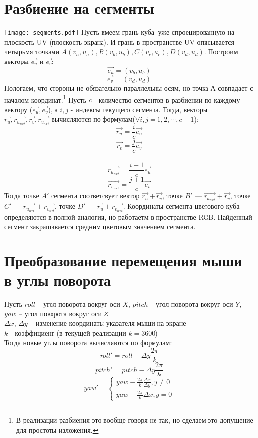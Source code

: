 \documentclass[a4paper,11pt]{article}
\begin{document}
  \section{Разбиение на сегменты}
 
  \texttt{[image: segments.pdf]}
  \linebreak 
   Пусть имеем грань куба, уже спроецированную на плоскость UV (плоскость экрана). И грань в пространстве UV описывается четырьмя точками $A(v_a,u_a), B(v_b,u_b), C(v_c,u_c), D(v_d,u_d)$. Построим векторы $\vec{e_u}$ и $\vec{e_v}$:
   \[ \vec{e_u} =  (v_b,u_b)\]
   \[ \vec{e_v} = (v_d,u_d)\]
   Пологаем, что стороны не обязательно параллельны осям, но точка $А$ совпадает с началом координат.\footnote{В реализации разбиения это вообще говоря не так, но сделаем это допущение для простоты изложения.} Пусть $c$ - количество сегментов в разбиении по каждому вектору ($\vec{e_u}, \vec{e_v}$), а $i,j$ - индексы текущего сегмента. Тогда, векторы $\vec{r_u}, \vec{r_{u_{nxt}}}, \vec{r_v}, \vec{r_{v_{nxt}}}$ вычисляются по формулам($\forall i,j = \overline{1,2,\cdots, c-1}  $):
  \[ \vec{r_u} = \frac{i}{c}\vec{e_u} \]
  \[ \vec{r_v} = \frac{j}{c}\vec{e_v} \]   
   \\
   \[ \vec{r_{u_{nxt}}} = \frac{i+1}{c}\vec{e_u} \]
   \[ \vec{r_{v_{nxt}}} = \frac{j+1}{c}\vec{e_v} \]
Тогда точке $A'$ сегмента соответсвует вектор $\vec{r_u}+\vec{r_v}$, точке $B'$ --- $\vec{r_{u_{nxt}}}+\vec{r_v}$, точке $C'$ --- $\vec{r_{u_{nxt}}}+\vec{r_{v_{nxt}}}$, точке $D'$ --- $\vec{r_u}+\vec{r_{v_{nxt}}}$.
  Координаты сегмента цветового куба определяются в полной аналогии, но работаетм в пространстве RGB. Найденный сегмент закрашивается средним цветовым значением сегмента. 
  
  
  \section{Преобразование перемещения мыши в углы поворота}
  Пусть $roll$ -- угол поворота вокруг оси $X$, $pitch$ -- угол поворота вокруг оси $Y$, $yaw$ -- угол поворота вокруг оси $Z$ \\
  $\varDelta x$, $\varDelta y$ -- изменение координаты указателя мыши на экране \\
  $k$ - коэффициент (в текущей реализации $k  = 3600$) \\
  Тогда новые углы поворота вычисляются по формулам: \\  
  \[ roll' = roll  -\varDelta y\frac{2\pi }{k} \] 
  \[ pitch' = pitch - \varDelta y\frac{2\pi }{k} \]
  \[ yaw' = \begin{cases}
    yaw - \frac{2\pi}{k} \frac{\varDelta x} {\varDelta y}, y\neq 0 \\
    yaw - \frac{2\pi}{k} \varDelta x , y = 0
  \end{cases} \]  
  
\end{document}
